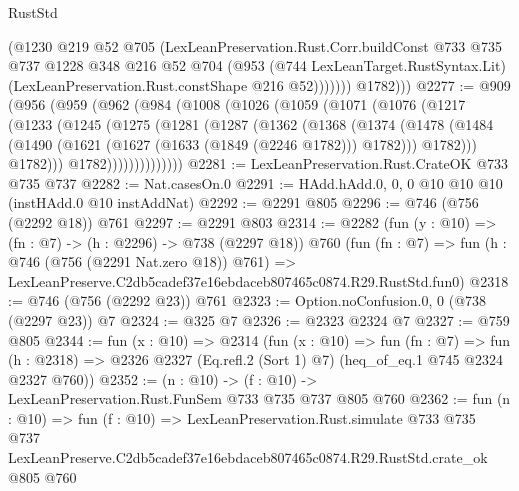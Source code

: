\begin{lexlean}{RustStd}
\begin{coremodule}
                (@1230
                  @219
                  @52
                  @705
                  (LexLeanPreservation.Rust.Corr.buildConst
                    @733
                    @735
                    @737
                    @1228
                    @348
                    @216
                    @52
                    @704
                    (@953
                      (@744 LexLeanTarget.RustSyntax.Lit)
                      (LexLeanPreservation.Rust.constShape @216 @52)))))))
          @1782)))
@2277 := @909
    (@956
      (@959
        (@962
          (@984
            (@1008
              (@1026
                (@1059
                  (@1071
                    (@1076
                      (@1217
                        (@1233
                          (@1245
                            (@1275
                              (@1281
                                (@1287
                                  (@1362
                                    (@1368
                                      (@1374
                                        (@1478
                                          (@1484
                                            (@1490
                                              (@1621 (@1627 (@1633 (@1849 (@2246 @1782))) @1782)))
                                            @1782)))
                                      @1782)))
                                @1782))))))))))))))
@2281 := LexLeanPreservation.Rust.CrateOK @733 @735 @737
@2282 := Nat.casesOn.{0}
@2291 := HAdd.hAdd.{0, 0, 0} @10 @10 @10 (instHAdd.{0} @10 instAddNat)
@2292 := @2291 @805
@2296 := @746 (@756 (@2292 @18)) @761
@2297 := @2291 @803
@2314 := @2282
    (fun (y : @10) => (fn : @7) -> (h : @2296) -> @738 (@2297 @18))
    @760
    (fun (fn : @7) =>
    fun (h : @746 (@756 (@2291 Nat.zero @18)) @761) =>
    LexLeanPreserve.C2db5cadef37e16ebdaceb807465c0874.R29.RustStd.fun0)
@2318 := @746 (@756 (@2292 @23)) @761
@2323 := Option.noConfusion.{0, 0} (@738 (@2297 @23)) @7
@2324 := @325 @7
@2326 := @2323 @2324 @7
@2327 := @759 @805
@2344 := fun (x : @10) =>
  @2314
    (fun (x : @10) =>
    fun (fn : @7) =>
    fun (h : @2318) => @2326 @2327 (Eq.refl.{2} (Sort 1) @7) (heq_of_eq.{1} @745 @2324 @2327 @760))
@2352 := (n : @10) -> (f : @10) -> LexLeanPreservation.Rust.FunSem @733 @735 @737 @805 @760
@2362 := fun (n : @10) =>
  fun (f : @10) =>
  LexLeanPreservation.Rust.simulate
    @733
    @735
    @737
    LexLeanPreserve.C2db5cadef37e16ebdaceb807465c0874.R29.RustStd.crate_ok
    @805
    @760
\end{coremodule}
\end{lexlean}
